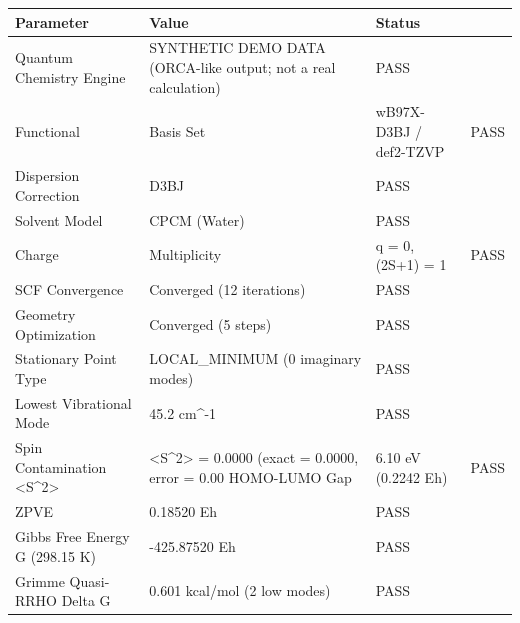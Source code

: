 \begin{tabular}{lll}
\toprule
Parameter & Value & Status \\
\midrule
Quantum Chemistry Engine & SYNTHETIC DEMO DATA (ORCA-like output; not a real calculation) & PASS \\
Functional & Basis Set & wB97X-D3BJ / def2-TZVP & PASS \\
Dispersion Correction & D3BJ & PASS \\
Solvent Model & CPCM (Water) & PASS \\
Charge & Multiplicity & q = 0, (2S+1) = 1 & PASS \\
SCF Convergence & Converged (12 iterations) & PASS \\
Geometry Optimization & Converged (5 steps) & PASS \\
Stationary Point Type & LOCAL_MINIMUM (0 imaginary modes) & PASS \\
Lowest Vibrational Mode & 45.2 cm^-1 & PASS \\
Spin Contamination <S^2> & <S^2> = 0.0000 (exact = 0.0000, error = 0.00%
HOMO-LUMO Gap & 6.10 eV (0.2242 Eh) & PASS \\
ZPVE & 0.18520 Eh & PASS \\
Gibbs Free Energy G (298.15 K) & -425.87520 Eh & PASS \\
Grimme Quasi-RRHO Delta G & 0.601 kcal/mol (2 low modes) & PASS \\
\bottomrule
\end{tabular}

